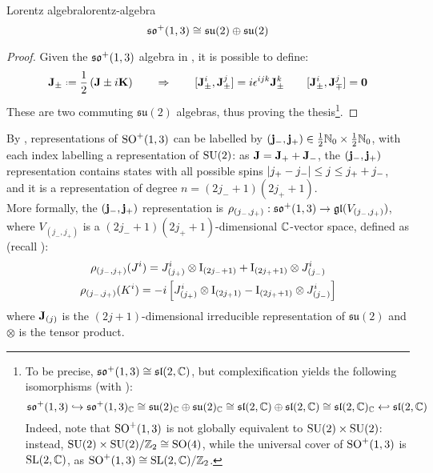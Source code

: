 \begin{proposition}[before upper = {\tcbtitle}]{Lorentz algebra}{lorentz-algebra}
  \begin{equation}
    \mathfrak{so}^+(1,3) \cong \mathfrak{su}(2) \oplus \mathfrak{su}(2)
  \end{equation}
\end{proposition}

\begin{proofbox}
  \begin{proof}
    Given the $ \mathfrak{so}^+(1,3) $ algebra in , it is possible to define:
    \begin{equation}
      \ve{J}_{\pm} \defeq \frac{1}{2} \left( \ve{J} \pm i \ve{K} \right)
      \qquad
      \Rightarrow
      \qquad
      [\ve{J}_{\pm}^i , \ve{J}_{\pm}^j] = i \epsilon^{ijk} \ve{J}_{\pm}^k
      \qquad
      [\ve{J}_{\pm}^i , \ve{J}_{\mp}^j] = \ve{0}
      \label{eq:lora-su2-gen}
    \end{equation}
    These are two commuting $ \mathfrak{su}(2) $ algebras, thus proving the thesis\footnote{To be precise, $ \mathfrak{so}^+(1,3) \cong \mathfrak{sl}(2,\mathbb{C}) $, but complexification yields the following isomorphisms (with ):
    \begin{equation*}
      \mathfrak{so}^+(1,3) \hookrightarrow \mathfrak{so}^+(1,3)_{\mathbb{C}} \cong \mathfrak{su}(2)_{\mathbb{C}} \oplus \mathfrak{su}(2)_{\mathbb{C}} \cong \mathfrak{sl}(2,\mathbb{C}) \oplus \mathfrak{sl}(2,\mathbb{C}) \cong \mathfrak{sl}(2,\mathbb{C})_{\mathbb{C}} \hookleftarrow \mathfrak{sl}(2,\mathbb{C})
    \end{equation*}
    Indeed, note that $ \mathrm{SO}^+(1,3) $ is not globally equivalent to $ \mathrm{SU}(2) \times \mathrm{SU}(2) $: instead, $ \mathrm{SU}(2) \times \mathrm{SU}(2) / \mathbb{Z}_2 \cong \mathrm{SO}(4) $, while the universal cover of $ \mathrm{SO}^+(1,3) $ is $ \mathrm{SL}(2,\mathbb{C}) $, as $ \mathrm{SO}^+(1,3) \cong \mathrm{SL}(2,\mathbb{C}) / \mathbb{Z}_2 $.}.
  \end{proof}
\end{proofbox}

By , representations of $ \mathrm{SO}^+(1,3) $ can be labelled by $ (\mathbf{j}_-,\mathbf{j}_+) \in \frac{1}{2} \mathbb{N}_0 \times \frac{1}{2} \mathbb{N}_0 $, with each index labelling a representation of $ \mathrm{SU}(2) $: as $ \mathbf{J} = \mathbf{J}_+ + \mathbf{J}_- $, the $ (\mathbf{j}_-,\mathbf{j}_+) $ representation contains states with all possible spins $ \left\lvert j_+ - j_-\right\rvert \le j \le j_+ + j_- $, and it is a representation of degree $ n = \left( 2j_- + 1 \right) \left( 2j_+ + 1 \right) $.\\
More formally, the $ (\mathbf{j}_-,\mathbf{j}_+) $ representation is $ \rho_{(j_-,j_+)} : \mathfrak{so}^+(1,3) \rightarrow \mathfrak{gl}(V_{(j_-,j_+)}) $, where $ V_{(j_-,j_+)} $ is a $ (2j_- + 1)(2j_+ + 1) $-dimensional $ \mathbb{C} $-vector space, defined as (recall ):
\begin{equation}
  \begin{gathered}
    \rho_{(j_-,j_+)}(J^i) = J^i_{(j_+)} \otimes \mathrm{I}_{(2j_- + 1)} + \mathrm{I}_{(2j_+ + 1)} \otimes J^i_{(j_-)} \\
    \rho_{(j_-,j_+)}(K^i) = -i \left[ J^i_{(j_+)} \otimes \mathrm{I}_{(2j_ + 1)} - \mathrm{I}_{(2j_+ + 1)} \otimes J^i_{(j_-)} \right]
  \end{gathered}
  \label{eq:lorentz-su2-repr}
\end{equation}
where $ \mathbf{J}_{(j)} $ is the $ (2j + 1) $-dimensional irreducible representation of $ \mathfrak{su}(2) $ and $ \otimes $ is the tensor product\footnotemark.

